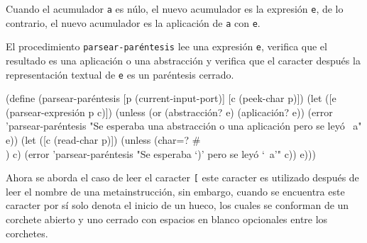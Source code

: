 \documentclass[letterpaper,twoside,openright,11pt]{book}
\begin{document}
Cuando el acumulador {\tt{}a} es núlo, el nuevo acumulador es la expresión {\tt{}e}, de lo contrario, el nuevo acumulador es la aplicación de {\tt{}a} con {\tt{}e}.

El procedimiento {\tt{}\protect{}parsear-paréntesis} lee una expresión {\tt{}e}, verifica que el resultado es una aplicación o una abstracción y verifica que el caracter después la representación textual de {\tt{}e} es un paréntesis cerrado.

\nwenddocs{}\plusendmoddef
(define (parsear-paréntesis [p (current-input-port)]
                            [c (peek-char p)])
  (let ([e (parsear-expresión p c)])
    (unless (or (abstracción? e) (aplicación? e))
      (error 'parsear-paréntesis
             "Se esperaba una abstracción o una aplicación pero se leyó ~a" e))
    (let ([c (read-char p)])
      (unless (char=? #\\) c)
        (error 'parsear-paréntesis
               "Se esperaba `)' pero se leyó `~a'" c))
      e)))

\eatline
{}\nwendcode{}\nwdocspar

Ahora se aborda el caso de leer el caracter {\tt{}{}{}[} este caracter es utilizado después de leer el nombre de una metainstrucción, sin embargo, cuando se encuentra este caracter por sí solo denota el inicio de un hueco, los cuales se conforman de un corchete abierto y uno cerrado con espacios en blanco opcionales entre los corchetes.
\end{document}
